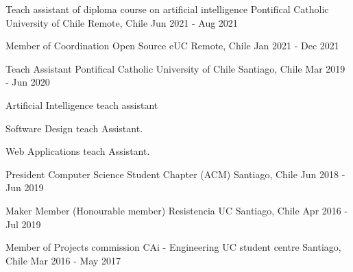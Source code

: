 

\begin{cventries}

\cventry
{Teach assistant of diploma course on artificial intelligence} %
{Pontifical Catholic University of Chile} %
{Remote, Chile} %
{Jun 2021 - Aug 2021} %
{}

\cventry
{Member of Coordination} %
{Open Source eUC} %
{Remote, Chile} %
{Jan 2021 - Dec 2021} %
{}

\cventry
{Teach Assistant} %
{Pontifical Catholic University of Chile} %
{Santiago, Chile} %
{Mar 2019 - Jun 2020} %
{
  \begin{cvitems} %
    \item {Artificial Intelligence teach assistant}
    \item {Software Design teach Assistant.}
    \item {Web Applications teach Assistant.}
  \end{cvitems}
}

\cventry
{President} %
{Computer Science Student Chapter (ACM)} %
{Santiago, Chile} %
{Jun 2018 - Jun 2019} %
{}


\cventry
{Maker Member (Honourable member)} %
{Resistencia UC} %
{Santiago, Chile} %
{Apr 2016 - Jul 2019} %
{}

\cventry
{Member of Projects commission} %
{CAi - Engineering UC student centre} %
{Santiago, Chile} %
{Mar 2016 - May 2017} %
{}


\end{cventries}
